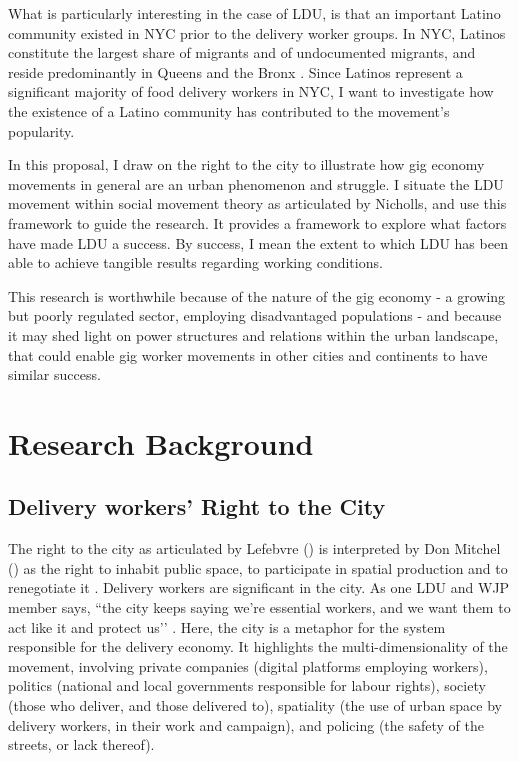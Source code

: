 \documentclass{article}[12pt]
\begin{document}
What is particularly interesting in the case of LDU, is that an important Latino community existed in NYC prior to the delivery worker groups. In NYC, Latinos constitute the largest share of migrants and of undocumented migrants, and reside predominantly in Queens and the Bronx \parencite{nycimmigrantpopulation2021}. Since Latinos represent a significant majority of food delivery workers in NYC, I want to investigate how the existence of a Latino community has contributed to the movement’s popularity.

In this proposal, I draw on the right to the city to illustrate how gig economy movements in general are an urban phenomenon and struggle.
I situate the LDU movement within social movement theory as articulated by Nicholls, and use this framework to guide the research. It provides a framework to explore what factors have made LDU a success. By success, I mean the extent to which LDU has been able to achieve tangible results regarding working conditions.

This research is worthwhile because of the nature of the gig economy - a growing but poorly regulated sector, employing disadvantaged populations - and because it may shed light on power structures and relations within the urban landscape, that could enable gig worker movements in other cities and continents to have similar success.

\section{Research Background}

\subsection{Delivery workers’ Right to the City}

The right to the city as articulated by Lefebvre (\citeyear{lefebvre1995writings}) is interpreted by Don Mitchel (\citeyear{mitchell2003right}) as the right to inhabit public space, to participate in spatial production and to renegotiate it \parencite{lee2018delivering}. Delivery workers are significant in the city. As one LDU and WJP member says, ``the city keeps saying we’re essential workers, and we want them to act like it and protect us’’ \parencite{ldutestimonials}. Here, the city is a metaphor for the system responsible for the delivery economy. It highlights the multi-dimensionality of the movement, involving private companies (digital platforms employing workers), politics (national and local governments responsible for labour rights), society (those who deliver, and those delivered to), spatiality (the use of urban space by delivery workers, in their work and campaign), and policing (the safety of the streets, or lack thereof).
\end{document}
